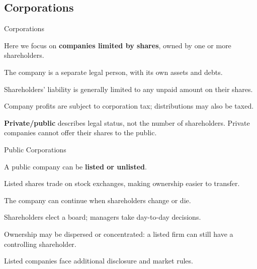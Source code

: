 \documentclass[9pt,aspectratio=169]{beamer}
\newenvironment{wideitemize}{\itemize\addtolength{\itemsep}{10pt}}{\enditemize}
\begin{document}
\subsection{Corporations}

\begin{frame}{Corporations}
\begin{wideitemize}
\item Here we focus on \textbf{companies limited by shares}, owned by one or more shareholders.
\item The company is a separate legal person, with its own assets and debts.
\item Shareholders' liability is generally limited to any unpaid amount on their shares.
\item Company profits are subject to corporation tax; distributions may also be taxed.
\item \textbf{Private/public} describes legal status, not the number of shareholders. Private companies cannot offer their shares to the public.
\end{wideitemize}
\end{frame}

\begin{frame}{Public Corporations}
\begin{wideitemize}
\item A public company can be \textbf{listed or unlisted}.
\item Listed shares trade on stock exchanges, making ownership easier to transfer.
\item The company can continue when shareholders change or die.
\item Shareholders elect a board; managers take day-to-day decisions.
\item Ownership may be dispersed or concentrated: a listed firm can still have a controlling shareholder.
\item Listed companies face additional disclosure and market rules.
\end{wideitemize}
\end{frame}
\end{document}
